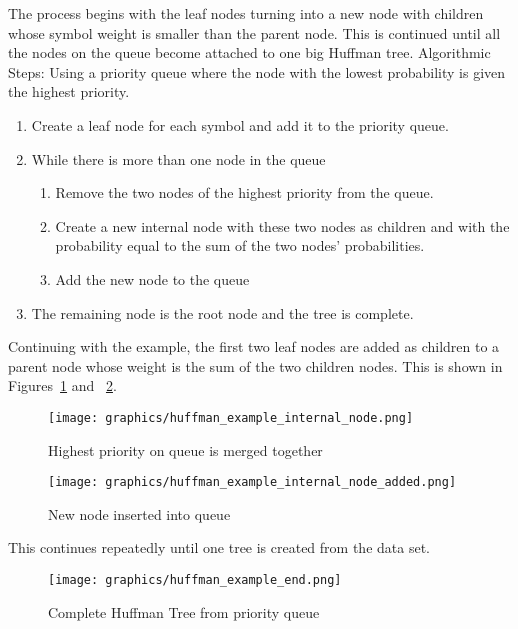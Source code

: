 \documentclass[letterpaper, 12pt]{article}
\begin{document}
The process begins with the leaf nodes turning into a new node with children whose symbol weight is smaller than
the parent node. This is continued until all the nodes on the queue become attached to one big Huffman tree.
Algorithmic Steps:
Using a priority queue where the node with the lowest probability is given the highest priority.
\begin{enumerate}
 \item Create a leaf node for each symbol and add it to the priority queue.
 \item While there is more than one node in the queue
 \begin{enumerate}
    \item Remove the two nodes of the highest priority from the queue.
    \item Create a new internal node with these two nodes as children and with the probability equal to
	  the sum of the two nodes' probabilities.
    \item Add the new node to the queue
  \end{enumerate}
  \item The remaining node is the root node and the tree is complete.
\end{enumerate}

Continuing with the example, the first two leaf nodes are added as children to a parent node whose
weight is the sum of the two children nodes. This is shown in Figures~\ref{fig:huffman_ex_int_1} and
~\ref{fig:huffman_ex_int_2}.
\par\vspace{\baselineskip}

\begin{figure}
  \centering
  \texttt{[image: graphics/huffman\_example\_internal\_node.png]}
  \caption{Highest priority on queue is merged together}
  \label{fig:huffman_ex_int_1}
\end{figure}

\begin{figure}
  \centering
  \texttt{[image: graphics/huffman\_example\_internal\_node\_added.png]}
  \caption{New node inserted into queue}
  \label{fig:huffman_ex_int_2}
\end{figure}

This continues repeatedly until one tree is created from the data set.
\par\vspace{\baselineskip}

\begin{figure}
  \centering
  \texttt{[image: graphics/huffman\_example\_end.png]}
  \caption{Complete Huffman Tree from priority queue}
\end{figure}
\end{document}
